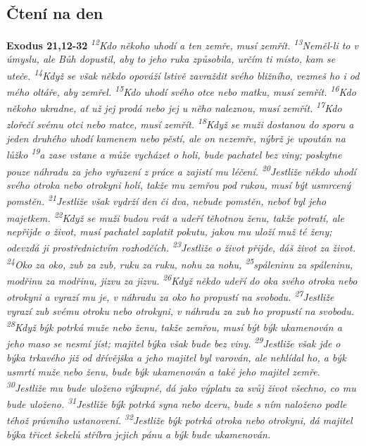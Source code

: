 \documentclass[11pt]{article}
\begin{document}
\subsection*{Čtení na den}
\textbf{Exodus 21,12-32}
\newline
\textit{
\textsuperscript{12}Kdo někoho uhodí a ten zemře, musí zemřít.
\textsuperscript{13}Neměl-li to v úmyslu, ale Bůh dopustil, aby to jeho ruka způsobila, určím ti místo, kam se uteče.
\textsuperscript{14}Když se však někdo opováží lstivě zavraždit svého bližního, vezmeš ho i od mého oltáře, aby zemřel.
\textsuperscript{15}Kdo uhodí svého otce nebo matku, musí zemřít.
\textsuperscript{16}Kdo někoho ukradne, ať už jej prodá nebo jej u něho naleznou, musí zemřít.
\textsuperscript{17}Kdo zlořečí svému otci nebo matce, musí zemřít.
\textsuperscript{18}Když se muži dostanou do sporu a jeden druhého uhodí kamenem nebo pěstí, ale on nezemře, nýbrž je upoután na lůžko
\textsuperscript{19}a zase vstane a může vycházet o holi, bude pachatel bez viny; poskytne pouze náhradu za jeho vyřazení z práce a zajistí mu léčení.
\textsuperscript{20}Jestliže někdo uhodí svého otroka nebo otrokyni holí, takže mu zemřou pod rukou, musí být usmrcený pomstěn.
\textsuperscript{21}Jestliže však vydrží den či dva, nebude pomstěn, neboť byl jeho majetkem.
\textsuperscript{22}Když se muži budou rvát a udeří těhotnou ženu, takže potratí, ale nepřijde o život, musí pachatel zaplatit pokutu, jakou mu uloží muž té ženy; odevzdá ji prostřednictvím rozhodčích.
\textsuperscript{23}Jestliže o život přijde, dáš život za život.
\textsuperscript{24}Oko za oko, zub za zub, ruku za ruku, nohu za nohu,
\textsuperscript{25}spáleninu za spáleninu, modřinu za modřinu, jizvu za jizvu.
\textsuperscript{26}Když někdo udeří do oka svého otroka nebo otrokyni a vyrazí mu je, v náhradu za oko ho propustí na svobodu.
\textsuperscript{27}Jestliže vyrazí zub svému otroku nebo otrokyni, v náhradu za zub ho propustí na svobodu.
\textsuperscript{28}Když býk potrká muže nebo ženu, takže zemřou, musí být býk ukamenován a jeho maso se nesmí jíst; majitel býka však bude bez viny.
\textsuperscript{29}Jestliže však jde o býka trkavého již od dřívějška a jeho majitel byl varován, ale nehlídal ho, a býk usmrtí muže nebo ženu, bude býk ukamenován a také jeho majitel zemře.
\textsuperscript{30}Jestliže mu bude uloženo výkupné, dá jako výplatu za svůj život všechno, co mu bude uloženo.
\textsuperscript{31}Jestliže býk potrká syna nebo dceru, bude s ním naloženo podle téhož právního ustanovení.
\textsuperscript{32}Jestliže býk potrká otroka nebo otrokyni, dá majitel býka třicet šekelů stříbra jejich pánu a býk bude ukamenován.
}
\end{document}
